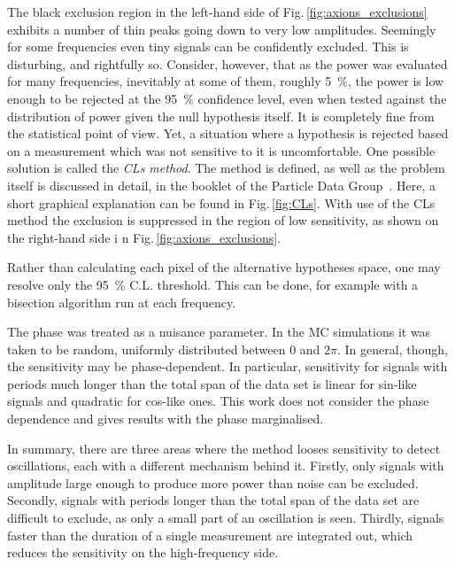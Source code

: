 The black exclusion region in the left-hand side of Fig.\,\ref{fig:axions_exclusions} exhibits a number of thin peaks going down to very low amplitudes.
Seemingly for some frequencies even tiny signals can be confidently excluded.
This is disturbing, and rightfully so.
Consider, however, that as the power was evaluated for many frequencies, inevitably at some of them, roughly \SI{5}{\percent}, the power is low enough to be rejected at the \SI{95}{\percent} confidence level, even when tested against the distribution of power given the null hypothesis itself.
It is completely fine from the statistical point of view.
Yet, a situation where a hypothesis is rejected based on a measurement which was not sensitive to it is uncomfortable.
One possible solution is called the \emph{CLs method}.
The method is defined, as well as the problem itself is discussed in detail, in the booklet of the Particle Data Group~\cite{PDG2016}.
Here, a short graphical explanation can be found in Fig.\,\ref{fig:CLs}.
With use of the CLs method the exclusion is suppressed in the region of low sensitivity, as shown on the right-hand side i n Fig.\,\ref{fig:axions_exclusions}.

Rather than calculating each pixel of the alternative hypotheses space, one may resolve only the \SI{95}{\percent} C.L.
threshold.
This can be done, for example with a bisection algorithm run at each frequency.

The phase was treated as a nuisance parameter.
In the MC simulations it was taken to be random, uniformly distributed between $0$ and $2\pi$.
In general, though, the sensitivity may be phase-dependent.
In particular, sensitivity for signals with periods much longer than the total span of the data set is linear for sin-like signals and quadratic for cos-like ones.
This work does not consider the phase dependence and gives results with the phase marginalised.

In summary, there are three areas where the method looses sensitivity to detect oscillations, each with a different mechanism behind it.
Firstly, only signals with amplitude large enough to produce more power than noise can be excluded.
Secondly, signals with periods longer than the total span of the data set are difficult to exclude, as only a small part of an oscillation is seen.
Thirdly, signals faster than the duration of a single measurement are integrated out, which reduces the sensitivity on the high-frequency side.




